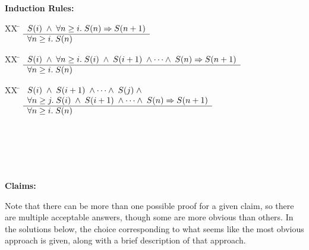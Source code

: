 \documentclass[]{exam}
\begin{document}
\begin{questions}
\begin{multicols}{2}
\columnbreak
{\bf Induction Rules:}\\
\begin{tabbing}
[1]XX \=  \kill
[1] \>
	\(\begin{array}[t]{l}
	S(i) \;\wedge\; \forall n \geq i.\;S(n) \Rightarrow S(n+1) \\
	\hline
	\forall n \geq i. \; S(n)
	\end{array}\) %
\end{tabbing}

\begin{tabbing}
[2]XX \=  \kill
[2] \>
	\(\begin{array}[t]{l}
	S(i) \;\wedge\; \forall n \geq i.\;S(i)\;\wedge\;S(i+1)\;\wedge\cdots\wedge\;S(n) \Rightarrow S(n+1) \\
	\hline
	\forall n \geq i. \; S(n)
	\end{array}\)
\end{tabbing}

\begin{tabbing}
[3]XX \=  \kill
[3] \>
	\(\begin{array}[t]{l}
	S(i) \;\wedge\; S(i+1)\;\wedge\cdots\wedge\;S(j)\;\wedge\; \\
\forall n \geq j.\;S(i)\;\wedge\;S(i+1)\;\wedge\cdots\wedge\;S(n) \Rightarrow S(n+1) \\
	\hline
	\forall n \geq i. \; S(n)
	\end{array}\) %
\end{tabbing}
~\\
~\\
~\\
~\\
    
\end{multicols}
\textbf{Claims:}
\begin{solution}
Note that there can be more than one possible proof for a given claim, so
there are multiple acceptable answers, though some are more obvious than
others. In the solutions below, the choice corresponding to what seems
like the most obvious approach is given, along with a brief description
of that approach.
\end{solution}
\end{questions}
\end{document}
